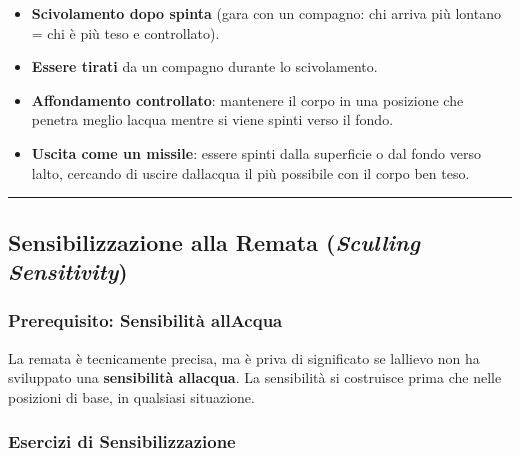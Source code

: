 \documentclass[a4paper,11pt]{article}
\providecommand{\tightlist}{%
  \setlength{\itemsep}{0pt}\setlength{\parskip}{0pt}}
\begin{document}
\begin{itemize}
      \tightlist
      \item
            \textbf{Scivolamento dopo spinta} (gara con un compagno: chi arriva
            più lontano = chi è più teso e controllato).
      \item
            \textbf{Essere tirati} da un compagno durante lo scivolamento.
      \item
            \textbf{Affondamento controllato}: mantenere il corpo in una posizione
            che penetra meglio l\textquotesingle acqua mentre si viene spinti
            verso il fondo.
      \item
            \textbf{Uscita come un missile}: essere spinti dalla superficie o dal
            fondo verso l\textquotesingle alto, cercando di uscire
            dall\textquotesingle acqua il più possibile con il corpo ben teso.
\end{itemize}

\begin{center}\rule{0.5\linewidth}{0.5pt}\end{center}

\subsection{\texorpdfstring{Sensibilizzazione alla Remata
            (\emph{Sculling
                  Sensitivity})}{Sensibilizzazione alla Remata (Sculling Sensitivity)}}\label{sensibilizzazione-alla-remata-sculling-sensitivity}

\subsubsection{Prerequisito: Sensibilità
      all\textquotesingle Acqua}\label{prerequisito-sensibilituxe0-allacqua}

La remata è tecnicamente precisa, ma è priva di significato se
l\textquotesingle allievo non ha sviluppato una \textbf{sensibilità
      all\textquotesingle acqua}. La sensibilità si costruisce prima che nelle
posizioni di base, in qualsiasi situazione.

\subsubsection{Esercizi di
      Sensibilizzazione}\label{esercizi-di-sensibilizzazione}
\end{document}
